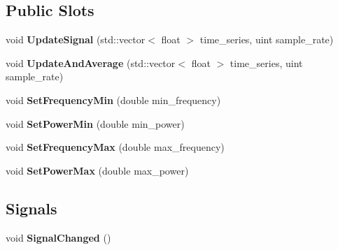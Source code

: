 \subsection*{Public Slots}
\begin{DoxyCompactItemize}
\item 
void {\bfseries Update\+Signal} (std\+::vector$<$ float $>$ time\+\_\+series, uint sample\+\_\+rate)\hypertarget{class_spectrum_analyzer_aa1979b784bdb752d6f635c4cecb9a4b6}{}\label{class_spectrum_analyzer_aa1979b784bdb752d6f635c4cecb9a4b6}

\item 
void {\bfseries Update\+And\+Average} (std\+::vector$<$ float $>$ time\+\_\+series, uint sample\+\_\+rate)\hypertarget{class_spectrum_analyzer_a75c8275f9739b3366c85d582a2c6f16d}{}\label{class_spectrum_analyzer_a75c8275f9739b3366c85d582a2c6f16d}

\item 
void {\bfseries Set\+Frequency\+Min} (double min\+\_\+frequency)\hypertarget{class_spectrum_analyzer_a442e34f2e52a974bc33d614c4714a9e3}{}\label{class_spectrum_analyzer_a442e34f2e52a974bc33d614c4714a9e3}

\item 
void {\bfseries Set\+Power\+Min} (double min\+\_\+power)\hypertarget{class_spectrum_analyzer_aeb522d65cc87a8491f2480b3ec1cf133}{}\label{class_spectrum_analyzer_aeb522d65cc87a8491f2480b3ec1cf133}

\item 
void {\bfseries Set\+Frequency\+Max} (double max\+\_\+frequency)\hypertarget{class_spectrum_analyzer_ad1d9bf78ce633b097641ee092645daae}{}\label{class_spectrum_analyzer_ad1d9bf78ce633b097641ee092645daae}

\item 
void {\bfseries Set\+Power\+Max} (double max\+\_\+power)\hypertarget{class_spectrum_analyzer_adcaf09fb5f0449b6dd95b97e2469af47}{}\label{class_spectrum_analyzer_adcaf09fb5f0449b6dd95b97e2469af47}

\end{DoxyCompactItemize}
\subsection*{Signals}
\begin{DoxyCompactItemize}
\item 
void {\bfseries Signal\+Changed} ()\hypertarget{class_spectrum_analyzer_afcbb7dc1848df0eb7d43160e489b8855}{}\label{class_spectrum_analyzer_afcbb7dc1848df0eb7d43160e489b8855}

\end{DoxyCompactItemize}
